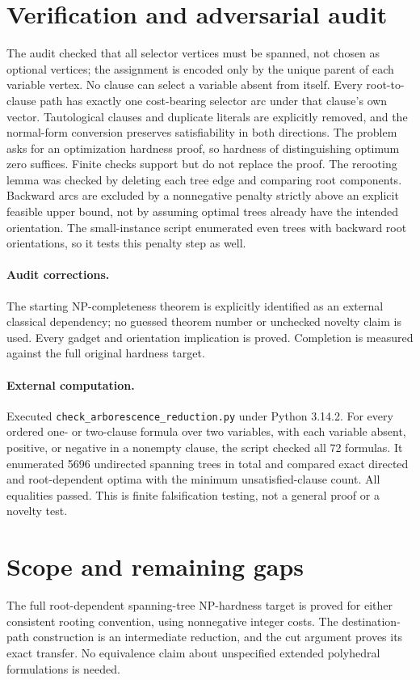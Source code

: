 \documentclass[11pt]{article}
\begin{document}
\section{Verification and adversarial audit}
The audit checked that all selector vertices must be spanned, not chosen as optional vertices; the assignment is encoded only by the unique parent of each variable vertex. No clause can select a variable absent from itself. Every root-to-clause path has exactly one cost-bearing selector arc under that clause's own vector. Tautological clauses and duplicate literals are explicitly removed, and the normal-form conversion preserves satisfiability in both directions. The problem asks for an optimization hardness proof, so hardness of distinguishing optimum zero suffices. Finite checks support but do not replace the proof. The rerooting lemma was checked by deleting each tree edge and comparing root components. Backward arcs are excluded by a nonnegative penalty strictly above an explicit feasible upper bound, not by assuming optimal trees already have the intended orientation. The small-instance script enumerated even trees with backward root orientations, so it tests this penalty step as well.
\paragraph{Audit corrections.} The starting NP-completeness theorem is explicitly identified as an external classical dependency; no guessed theorem number or unchecked novelty claim is used. Every gadget and orientation implication is proved. Completion is measured against the full original hardness target.
\paragraph{External computation.} Executed \texttt{check\_arborescence\_reduction.py} under Python 3.14.2. For every ordered one- or two-clause formula over two variables, with each variable absent, positive, or negative in a nonempty clause, the script checked all 72 formulas. It enumerated 5696 undirected spanning trees in total and compared exact directed and root-dependent optima with the minimum unsatisfied-clause count. All equalities passed. This is finite falsification testing, not a general proof or a novelty test.
\section{Scope and remaining gaps}
The full root-dependent spanning-tree NP-hardness target is proved for either consistent rooting convention, using nonnegative integer costs. The destination-path construction is an intermediate reduction, and the cut argument proves its exact transfer. No equivalence claim about unspecified extended polyhedral formulations is needed.
\end{document}
